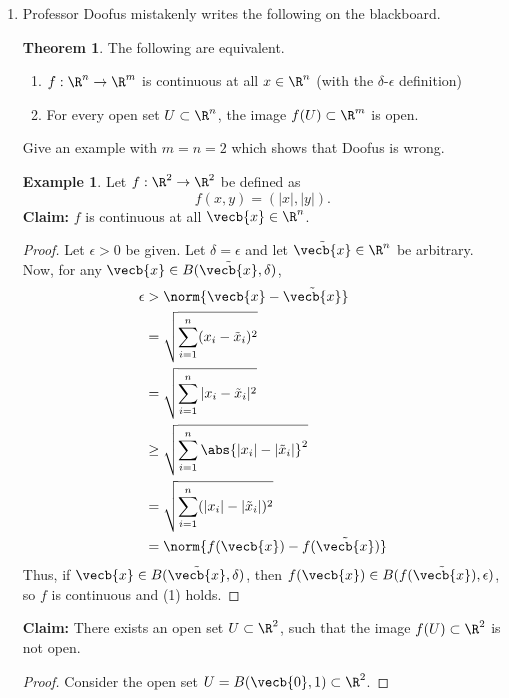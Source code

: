 \documentclass[a5paper]{article}
\theoremstyle{definition}%
\newtheorem*{example*}{Example}
\newtheorem*{romantheorem*}{Theorem} %
\numberwithin{exercise}{section}
\theoremstyle{remark}%
\begin{document}
\begin{enumerate}
\item Professor Doofus mistakenly writes the following on the blackboard.
\begin{romantheorem*}The following are equivalent.
\begin{enumerate}[label=(\arabic*)]
	\item $f:\R^n \to \R^m$ is continuous at all $x \in \R^n$ (with the $\delta$-$\epsilon$ definition)
	\item For every open set $U \subset \R^n$, the image $f(U) \subset \R^m$ is open. 
\end{enumerate}
\end{romantheorem*}
Give an example with $m=n=2$ which shows that Doofus is wrong. 
\begin{example*}
Let $f:\R^2\to\R^2$ be defined as 
$$f(x,y) = (|x|, |y|).$$ 
\textbf{Claim:} $f$ is continuous at all $\vecb{x} \in \R^n$.
\begin{proof}
Let $\epsilon > 0$ be given. Let $\delta=\epsilon$ and let $\tilde{\vecb{x}} \in \R^n$ be arbitrary. Now, for any $\vecb{x} \in B(\tilde{\vecb{x}}, \delta)$, 
\[\begin{aligned}
\epsilon &> \norm{\vecb{x}-\tilde{\vecb{x}}}\\
&= \sqrt{\sum_{i=1}^n (x_i-\tilde{x}_i)^2}\\
&= \sqrt{\sum_{i=1}^n |x_i-\tilde{x}_i|^2}\\
&\geq \sqrt{\sum_{i=1}^n \abs{|x_i|-|\tilde{x}_i|}^2}\\
&= \sqrt{\sum_{i=1}^n (|x_i|-|\tilde{x}_i|)^2}\\
&= \norm{f(\vecb{x})-f(\tilde{\vecb{x}})}\\
\end{aligned}\]
Thus, if $\vecb{x} \in B(\tilde{\vecb{x}}, \delta)$, then $f(\vecb{x}) \in B(f(\tilde{\vecb{x}}), \epsilon)$, so $f$ is continuous and (1) holds. 
\end{proof}

\textbf{Claim:} There exists an open set $U \subset \R^2$, such that the image $f(U) \subset \R^2$ is not open.
\begin{proof}
Consider the open set $U=B(\vecb{0},1) \subset \R^2$. 




\end{proof}
\end{example*}
\end{enumerate}
\end{document}
